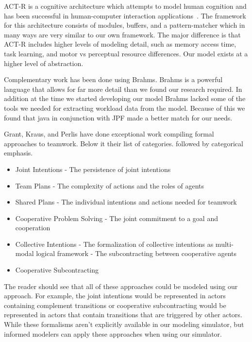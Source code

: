 ACT-R is a cognitive architecture which attempts to model human cognition and
has been successful in human-computer interaction applications~\cite{anderson2004integrated,lebiere2013cognitive}.  The
framework for this architecture consists of modules, buffers, and a pattern-matcher which in many ways are very similar to our own framework.  The major
difference is that ACT-R includes higher levels of modeling detail, such as memory access
time, task learning, and motor vs perceptual resource differences.  Our model exists at a higher level of abstraction.

Complementary work has been done using Brahms. Brahms is a powerful language that allows for far more detail than we found our research required. In addition at the time we started developing our model Brahms lacked some of the tools we needed for extracting workload data from the model. Because of this we found that java in conjunction with JPF made a better match for our needs.

Grant, Kraus, and Perlis have done exceptional work compiling formal approaches
to teamwork. Below it their list of categories. followed by categorical
emphasis.
\begin{itemize}
	\item Joint Intentions - The persistence of joint intentions
	\item Team Plans - The complexity of actions and the roles of agents
	\item Shared Plans - The individual intentions and actions needed for teamwork
	\item Cooperative Problem Solving - The joint commitment to a goal and
	cooperation
	\item Collective Intentions - The formalization of collective intentions as
	multi-modal logical framework - The subcontracting between cooperative agents
	\item Cooperative Subcontracting 
\end{itemize}
The reader should see that all of these approaches could be modeled using our
approach. For example, the joint intentions would be represented in actors
containing complement transitions or cooperative subcontracting would be
represented in actors that contain transitions that are triggered by other
actors. While these formalisms aren't explicitly available in our modeling
simulator, but informed modelers can apply these approaches when using our simulator.
